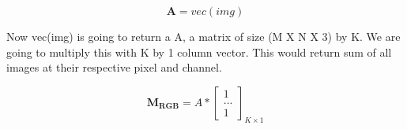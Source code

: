 \documentclass{article}
\newcommand{\matr}[1]{\mathbf{#1}}
\begin{document}
		\begin{equation*}
		\matr{A} = vec(img)
		\end{equation*}

		Now vec(img) is going to return a A, a matrix of size (M X N X 3) by K. We are going to multiply this with K by 1 column vector. 
		This would return sum of all images at their respective pixel and channel.

		\begin{equation*}
		\matr{M_{RGB}} = A * 
						\begin{bmatrix} 
						1 \\  ... \\ 1  
						\end{bmatrix}_{K \times 1} 
		\end{equation*}	
		 
		\subsubsection{} %
\end{document}
